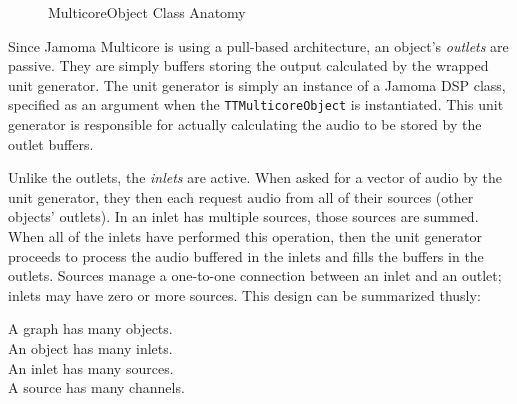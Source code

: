 \documentclass[twoside,a4paper]{article}
\begin{document}
\begin{figure}[htbp]
\centerline{}
\caption{MulticoreObject Class Anatomy}
\label{fig:anatomy}
\end{figure}

Since Jamoma Multicore is using a pull-based architecture, an object's \emph{outlets} are passive.  They are simply buffers storing the output calculated by the wrapped unit generator.  The unit generator is simply an instance of a Jamoma DSP class, specified as an argument when the \texttt{TTMulticoreObject} is instantiated.  This unit generator is responsible for actually calculating the audio to be stored by the outlet buffers.

Unlike the outlets, the \emph{inlets} are active.  When asked for a vector of audio by the unit generator, they then each request audio from all of their sources (other objects' outlets).  In an inlet has multiple sources, those sources are summed.  When all of the inlets have performed this operation, then the unit generator proceeds to process the audio buffered in the inlets and fills the buffers in the outlets.  Sources manage a one-to-one connection between an inlet and an outlet; inlets may have zero or more sources.  This design can be summarized thusly:

				A graph has many objects.\\
\indent	An object has many inlets.\\
\indent	An inlet has many sources.\\
\indent	A source has many channels.\\
\end{document}
